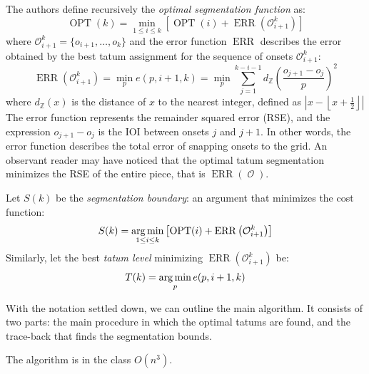 The authors define recursively the \emph{optimal segmentation function} as: $$\operatorname{OPT}(k) = \min_{1\leq i \leq k}\left[\operatorname{OPT}(i) + \operatorname{ERR}\left(\mathcal{O}_{i+1}^k\right)\right]$$ where $\mathcal{O}_{i+1}^k=\{o_{i+1},\ldots,o_k\}$ and the error function $\operatorname{ERR}$ describes the error obtained by the best tatum assignment for the sequence of onsets $\mathcal{O}_{i+1}^k$: $$\operatorname{ERR}\left(\mathcal{O}_{i+1}^k\right)=\min_p e\left(p,i+1,k\right)=\min_p \sum_{j=1}^{k-i-1}d_{\mathbb{Z}}\left(\frac{o_{j+1}-o_j}{p}\right)^2$$ where $d_{\mathbb{Z}}(x)$ is the distance of $x$ to the nearest integer, defined as $\left|x - \left\lfloor x + \tfrac{1}{2}\right\rfloor\right|$ The error function represents the remainder squared error (RSE), and the expression $o_{j+1}-o_j$ is the IOI between onsets $j$ and $j+1$. In other words, the error function describes the total error of snapping onsets to the grid. An observant reader may have noticed that the optimal tatum segmentation minimizes the RSE of the entire piece, that is $\operatorname{ERR}\left(\operatorname{\mathcal{O}}\right)$. 

Let $S(k)$ be the \emph{segmentation boundary}: an argument that minimizes the cost function: $$S(k)=\argmin_{1\leq i \leq k}\left[\operatorname{OPT}(i) + \operatorname{ERR}\left(\mathcal{O}_{i+1}^k\right)\right]$$ Similarly, let the best \emph{tatum level} minimizing $\operatorname{ERR}\left(\mathcal{O}_{i+1}^k\right)$ be: $$T(k)=\argmin_{p} e(p,i+1,k)$$ 

With the notation settled down, we can outline the main algorithm. It consists of two parts: the main procedure in which the optimal tatums are found, and the trace-back that finds the segmentation bounds.



The algorithm is in the class $O\left(n^3\right)$.